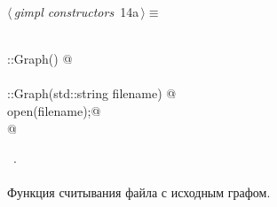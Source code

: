 \documentclass[12pt]{article}
\begin{document}
\begin{flushleft} \small
\begin{minipage}{\linewidth}\label{scrap22}\raggedright\small
{} $\langle\,${\itshape gimpl constructors}\nobreak\ {\footnotesize {14a}}$\,\rangle\equiv$
\vspace{-1ex}
\begin{list}{}{} \item
\mbox{}\verb@@\\
\mbox{}\verb@Graph::Graph() { }@\\
\mbox{}\verb@@\\
\mbox{}\verb@Graph::Graph(std::string filename) {@\\
\mbox{}\verb@    open(filename);@\\
\mbox{}\verb@} @\\
\mbox{}\verb@@{\NWsep}
\end{list}
\vspace{-1.5ex}
\footnotesize
\begin{list}{}{\setlength{\itemsep}{-\parsep}\setlength{\itemindent}{-\leftmargin}}
\item \NWtxtMacroRefIn\ .

\item{}
\end{list}
\end{minipage}\vspace{4ex}
\end{flushleft}
\paragraph{}
Функция считывания файла с исходным графом.
\end{document}
